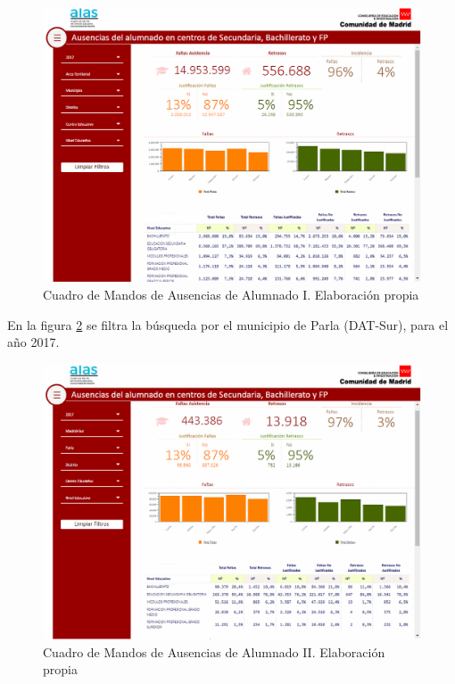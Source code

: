 \begin{figure}[htb]
	\centering
	\caption{Cuadro de Mandos de Ausencias de Alumnado I. Elaboración propia}
	\label{fig:FaltasAsistenciaI}
	\includegraphics[width=1\textwidth]{recursos/FaltasAsistenciaI}
\end{figure}
\FloatBarrier

En la figura \ref{fig:FaltasAsistenciaII} se filtra la búsqueda por el municipio de Parla (DAT-Sur), para el año 2017.

\begin{figure}[htb]
	\centering
	\caption{Cuadro de Mandos de Ausencias de Alumnado II. Elaboración propia}
	\label{fig:FaltasAsistenciaII}
	\includegraphics[width=1\textwidth]{recursos/FaltasAsistenciaII}
\end{figure}
\FloatBarrier

